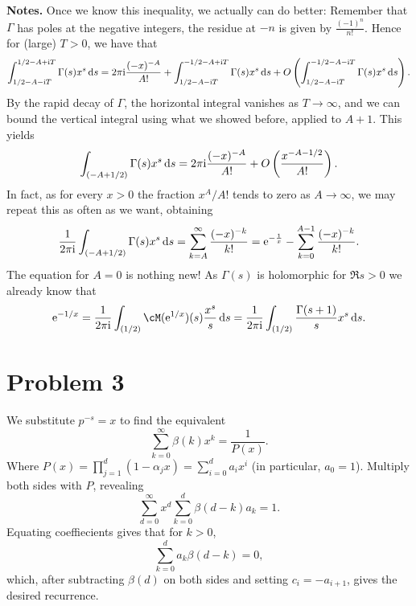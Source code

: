 \documentclass[a4paper,11pt]{article}
\begin{document}
\textbf{Notes.}
Once we know this inequality, we actually can do better: Remember that $\Gamma$ has poles at
the negative integers, the residue at $-n$ is given by $\tfrac{(-1)^n}{n!}$. Hence for 
(large) $T > 0$, we have that 
\[
    \int_{1/2-A-\mathrm i T}^{1/2 - A +\mathrm i T} \Gamma(s) x^s \mathrm{\,d} s =
    2 \pi \mathrm i \frac{(-x)^{-A}}{A!} + \int_{1/2-A-\mathrm i T}^{-1/2 - A + \mathrm i T} \Gamma(s) x^s
    \mathrm{\,d} s + O\left( \int_{1/2-A-\mathrm i T}^{-1/2-A - \mathrm i T}  \Gamma(s) x^s \mathrm{\,d} s\right). 
\]
By the rapid decay of $\Gamma$, the horizontal integral vanishes as $T
\rightarrow \infty$, and we can bound the vertical integral using what we
showed before, applied to $A+1$. This yields
\[
    \int_{(-A+1/2)} \Gamma(s) x^s \mathrm{\,d} s = 2 \pi \mathrm i \frac{(-x)^{-A}}{A!} + O\left(\frac{x^{-A-1/2}}{A!}\right).
\]
In fact, as for every $x>0$ the fraction $x^A/A!$ tends to zero as $A \to \infty$, we
may repeat this as often as we want, obtaining
\[
    \frac 1{2 \pi \mathrm i} \int_{(-A+1/2)} \Gamma(s) x^s \mathrm{\,d} s = \sum_{k=A}^\infty \frac{(-x)^{-k}}{k!} 
    = \mathrm e^{-\frac 1x} - \sum_{k=0}^{A-1} \frac{(-x)^{-k}}{k!}.
\]
The equation for $A= 0$ is nothing new! As $\Gamma(s)$ is holomorphic
for $\Re s > 0$ we already know that
\[
    \ec^{-1/x} = \frac{1}{2 \pi \ic} \int_{(1/2)} \cM(\ec^{1/x})(s) \frac{x^s}s \dc s
    = \frac{1}{2 \pi \ic} \int_{(1/2)} \frac{\Gamma(s+1)}{s} x^s \dc s.
\]

\section*{Problem 3}
We substitute $p^{-s} = x$ to find the equivalent
\[
    \sum_{k=0}^\infty \beta(k) x^k = \frac 1 {P(x)}. 
\]
Where $P(x) = \prod_{j=1}^d(1-\alpha_j x)= \sum_{i = 0}^d a_i x^i$ (in particular,
$a_0 = 1$). Multiply both sides with $P$, revealing
\[
    \sum_{d=0}^\infty x^d \sum_{k=0}^d \beta(d-k) a_k = 1.
\]
Equating coeffiecients gives that for $k>0$, 
\[
    \sum_{k=0}^d a_k \beta(d-k) = 0,
\]
which, after subtracting $\beta(d)$ on both sides and setting $c_i = -a_{i+1}$,
gives the desired recurrence.
\end{document}
